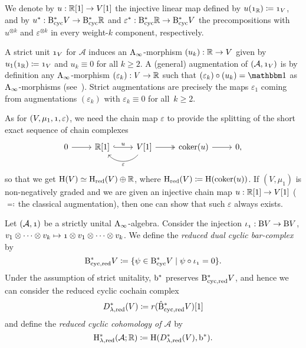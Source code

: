 \documentclass[\MainFolder/Text.tex]{subfiles}
\begin{document}
We denote by $u: \mathbb{R}[1] \rightarrow V[1]$ the injective linear map defined by $u(\NOne_\R)\coloneqq \NOne_V$, and by $u^*: \mathrm{B}_{\mathrm{cyc}}^* V \rightarrow \mathrm{B}_{\mathrm{cyc}}^* \mathbb{R}$ and $\varepsilon^*: \mathrm{B}_{\mathrm{cyc}}^* \mathbb{R} \rightarrow \mathrm{B}_{\mathrm{cyc}}^* V$ the precompositions with $u^{\otimes k}$ and $\varepsilon^{\otimes k}$ in every weight-$k$ component, respectively. 

\begin{Remark}\label{Rem:AugUnit}
\begin{RemarkList}
\item A strict unit $\NOne_V$ for $\mathcal{A}$ induces an $\mathrm{A}_\infty$-morphism $(u_k): \mathbb{R} \rightarrow V$ given by $u_1(\NOne_\R)\coloneqq \NOne_V$ and $u_k \equiv 0$ for all $k\ge 2$. A (general) augmentation of $(\mathcal{A},\NOne_V)$ is by definition any $\mathrm{A}_\infty$-morphism $(\varepsilon_k): V \rightarrow \mathbb{R}$ such that $(\varepsilon_k) \circ (u_k) = \Id$ as $\mathrm{A}_\infty$-morphisms (see~\cite{Keller1999}). Strict augmentations are precisely the maps $\varepsilon_1$ coming from augmentations $(\varepsilon_k)$ with $\varepsilon_k \equiv 0$ for all~$k\ge 2$.

\item As for $(V,\mu_1,\NOne,\varepsilon)$, we need the chain map $\varepsilon$ to provide the splitting of the short exact sequence of chain complexes
$$\begin{tikzcd}
0 \arrow{r} & \R[1] \arrow[hook]{r}{u} & \arrow[bend left=50]{l}{\varepsilon} V[1] \arrow[two heads]{r} & \coker(u) \arrow{r} & 0,
\end{tikzcd}$$
so that we get $\mathrm{H}(V) \simeq \mathrm{H}_{\mathrm{red}}(V)\oplus \mathbb{R}$, where $\mathrm{H}_{\mathrm{red}}(V)\coloneqq \mathrm{H}(\operatorname{\mathrm{coker}}(u))$. If $(V,\mu_1)$ is non-negatively graded and we are given an injective chain map $u: \mathbb{R}[1] \rightarrow V[1]$ ($\eqqcolon$\,the classical augmentation), then one can show that such $\varepsilon$ always exists. \qedhere
\end{RemarkList}
\end{Remark}

\begin{Definition}\label{Def:ReducedDual}
Let $(\mathcal{A}, \NOne)$ be a strictly unital $\mathrm{A}_\infty$-algebra. Consider the injection $\iota_{\NOne}: \B V \rightarrow \B V$, $v_1 \otimes \dotsb \otimes v_k \mapsto \NOne \otimes v_1 \otimes \dotsb \otimes v_k$. We define the \emph{reduced dual cyclic bar-complex} by
$$ \RedDBCyc V \coloneqq \{\psi \in \DBCyc V \mid \psi\circ \iota_{\NOne} = 0\}. $$
Under the assumption of strict unitality, $\mathrm{b}^*$ preserves $\mathrm{B}_{\mathrm{cyc},\mathrm{red}}^* V$, and hence we can consider the reduced cyclic cochain complex 
$$ D_{\lambda,\mathrm{red}}^*(V) \coloneqq r(\hat{\mathrm{B}}^*_{\mathrm{cyc},\mathrm{red}} V)[1]$$
and define the \emph{reduced cyclic cohomology of $\mathcal{A}$} by
$$ \mathrm{H}_{\lambda, \mathrm{red}}^*(\mathcal{A};\mathbb{R})\coloneqq \mathrm{H}(D_{\lambda, \mathrm{red}}^*(V), \mathrm{b}^*). $$ 
\end{Definition}
\end{document}
